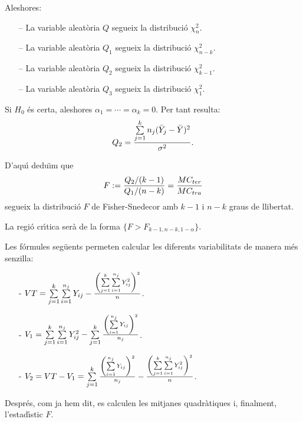 \begin{enumerate}
Aleshores:

\begin{itemize}
\item[--] La variable aleat\`oria $Q$ segueix la distribuci\'o $\chi_n^2$.

\item[--] La variable aleat\`oria $Q_1$ segueix la distribuci\'o $\chi_{n-k}^2$.

\item[--] La variable aleat\`oria $Q_2$ segueix la distribuci\'o $\chi_{k-1}^2$.

\item[--] La variable aleat\`oria $Q_3$ segueix la distribuci\'o $\chi_1^2$.
\end{itemize}

Si $H_0$ \'es certa, aleshores $\alpha_1 = \cdots = \alpha_k = 0$. Per tant
resulta:
$$Q_2 = {\sum\limits_{j=1}^k n_j (\bar{Y}_j - \bar{Y})^2 \over \sigma^2}.$$

D'aqu\'{\i} dedu\"{\i}m que
$$F := {Q_2 / (k-1) \over Q_1 / (n-k)} = {MC_{ter} \over MC_{tra}}$$
segueix la distribuci\'o $F$ de Fisher-Snedecor amb $k-1$ i $n-k$ graus de
llibertat.

La regi\'o cr\'{\i}tica ser\`a de la forma $\{ F > F_{k-1,n-k,1-\alpha} \}$.

Les f\'ormules seg\"uents permeten calcular les diferents variabilitats de manera m\'es
senzilla:

\begin{itemize}
\item[-] $VT = \sum\limits_{j=1}^k \sum\limits_{i=1}^{n_j} Y_{ij} - {\left(
\sum\limits_{j=1}^k \sum\limits_{i=1}^{n_j} Y_{ij}^2\right)^2 \over n}$.

\item[-] $V_1 = \sum\limits_{j=1}^k \sum\limits_{i=1}^{n_j} Y_{ij}^2 -
\sum\limits_{j=1}^k {\left( \sum\limits_{i=1}^{n_j} Y_{ij} \right)^2 \over n_j}$.

\item[-] $V_2 = VT - V_1 = \sum\limits_{j=1}^k {\left( \sum\limits_{i=1}^{n_j} Y_{ij}
\right)^2 \over n_j} - {\left( \sum\limits_{j=1}^k \sum\limits_{i=1}^{n_j}
Y_{ij}^2\right)^2 \over n}$.
\end{itemize}

Despr\'es, com ja hem dit, es calculen les mitjanes quadr\`atiques i, finalment,
l'estad\'{\i}stic $F$.


\end{enumerate}
